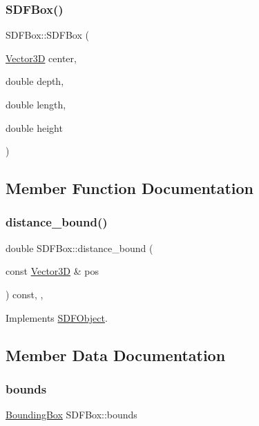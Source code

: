 \subsubsection{\texorpdfstring{SDFBox()}{SDFBox()}}
{\footnotesize\ttfamily S\+D\+F\+Box\+::\+S\+D\+F\+Box (\begin{DoxyParamCaption}\item[{\mbox{\hyperlink{classVector3D}{Vector3D}}}]{center,  }\item[{double}]{depth,  }\item[{double}]{length,  }\item[{double}]{height }\end{DoxyParamCaption})}



\subsection{Member Function Documentation}
\mbox{\label{classSDFBox_aaeab9858412c2f3ad7e19ec9738e8aca}} 
\subsubsection{\texorpdfstring{distance\_bound()}{distance\_bound()}}
{\footnotesize\ttfamily double S\+D\+F\+Box\+::distance\+\_\+bound (\begin{DoxyParamCaption}\item[{const \mbox{\hyperlink{classVector3D}{Vector3D}} \&}]{pos }\end{DoxyParamCaption}) const\hspace{0.3cm}{\ttfamily [override]}, {\ttfamily [private]}, {\ttfamily [virtual]}}



Implements \mbox{\hyperlink{classSDFObject_ac34f5232b6ea395178d33e3b084d5a93}{S\+D\+F\+Object}}.



\subsection{Member Data Documentation}
\mbox{\label{classSDFBox_a3cb36bcbfc2b009bec6d2880ac3e93f0}} 
\subsubsection{\texorpdfstring{bounds}{bounds}}
{\footnotesize\ttfamily \mbox{\hyperlink{classBoundingBox}{Bounding\+Box}} S\+D\+F\+Box\+::bounds\hspace{0.3cm}{\ttfamily [private]}}

